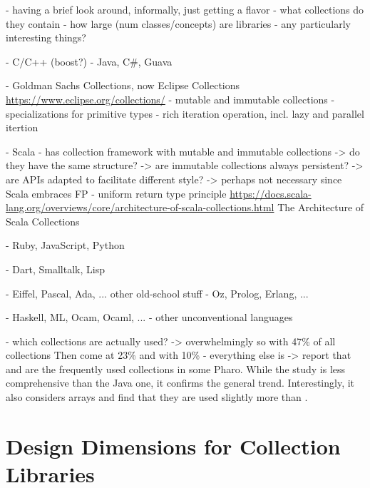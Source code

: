 \documentclass[sigconf, 10pt]{acmart}
\begin{document}
\begin{note}
- having a brief look around, informally, just getting a flavor
 - what collections do they contain
 - how large (num classes/concepts) are libraries
 - any particularly interesting things?

- C/C++ (boost?)
- Java, C\#, Guava

  - Goldman Sachs Collections, now Eclipse Collections
  \url{https://www.eclipse.org/collections/} %
   - mutable and immutable collections
   - specializations for primitive types
   - rich iteration operation, incl. lazy and parallel itertion
  
  
  - Scala
    - has collection framework with mutable and immutable collections
      -> do they have the same structure?
      -> are immutable collections always persistent?
      -> are APIs adapted to facilitate different style?
        -> perhaps not necessary since Scala embraces FP
    - uniform return type principle  \url{https://docs.scala-lang.org/overviews/core/architecture-of-scala-collections.html} 
     The Architecture of Scala Collections  
  

- Ruby, JavaScript, Python

- Dart, Smalltalk, Lisp

- Eiffel, Pascal, Ada, ... other old-school stuff
- Oz, Prolog, Erlang, ... 

- Haskell, ML, Ocam, Ocaml, ...
- other unconventional languages





- which collections are actually used?
 ->  overwhelmingly so with 47\% of all collections
    Then come  at 23\% and  with 10\% \citep{Costa:2017:ESU} 
    - everything else is 
 -> \citet[sec. 9.2]{Bergel:2018} report that  and  are the frequently used collections in some Pharo.
 While the study is less comprehensive than the Java one, it confirms the general trend. Interestingly, it also considers arrays and find that they are used slightly more than .



\end{note}

\section{Design Dimensions for Collection Libraries}
\end{document}
